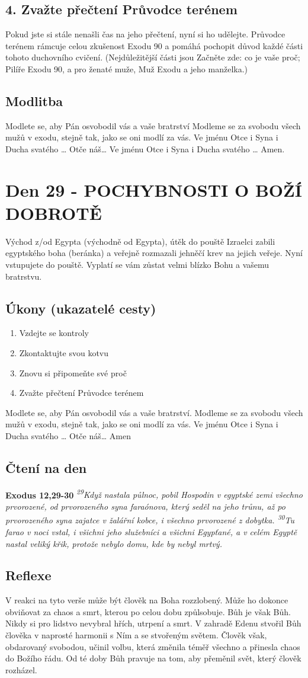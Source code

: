 \documentclass[11pt]{article}
\newcommand{\zacatekPatyTyden}{
  Východ z/od Egypta (východně od Egypta), útěk do pouště \newline
  Izraelci zabili egyptského boha (beránka) a veřejně rozmazali jehněčí krev na jejich veřeje. Nyní vstupujete
  do pouště. Vyplatí se vám zůstat velmi blízko Bohu a vašemu bratrstvu.

\subsection*{Úkony (ukazatelé cesty)}
\begin{enumerate}
  \item Vzdejte se kontroly
  \item Zkontaktujte svou kotvu
  \item Znovu si připomeňte své proč
  \item Zvažte přečtení Průvodce terénem
\end{enumerate}
Modlete se, aby Pán osvobodil vás a vaše bratrství. \newline
Modleme se za svobodu všech mužů v exodu, stejně tak, jako se oni modlí za vás.\newline
Ve jménu Otce i Syna i Ducha svatého …  Otče náš… Amen
}
\begin{document}
\subsection*{4. Zvažte přečtení Průvodce terénem}
Pokud jste si stále nenašli čas na jeho přečtení, nyní si ho udělejte. Průvodce terénem rámcuje celou zkušenost Exodu 90 a pomáhá pochopit důvod každé části tohoto duchovního cvičení. (Nejdůležitější části jsou Začněte zde: co je vaše proč; Pilíře Exodu 90, a pro ženaté muže, Muž Exodu a jeho manželka.)

\subsection*{Modlitba}
Modlete se, aby Pán osvobodil vás a vaše bratrství \newline
Modleme se za svobodu všech mužů v exodu, stejně tak, jako se oni modlí za vás.\newline
Ve jménu Otce i Syna i Ducha svatého … Otče náš… Ve jménu Otce i Syna i Ducha svatého … Amen.


\newpage
\section{Den 29 - POCHYBNOSTI O BOŽÍ DOBROTĚ}
\zacatekPatyTyden
\subsection*{Čtení na den}
\textbf{Exodus 12,29-30}
\newline
\textit{
\textsuperscript{29}Když nastala půlnoc, pobil Hospodin v egyptské zemi všechno prvorozené, od prvorozeného syna faraónova, který seděl na jeho trůnu, až po prvorozeného syna zajatce v žalářní kobce, i všechno prvorozené z dobytka.
\textsuperscript{30}Tu farao v noci vstal, i všichni jeho služebníci a všichni Egypťané, a v celém Egyptě nastal veliký křik, protože nebylo domu, kde by nebyl mrtvý.
}

\subsection*{Reflexe}

V reakci na tyto verše může být člověk na Boha rozzlobený. Může ho dokonce obviňovat za chaos a smrt,
kterou po celou dobu způlsobuje. Bůh je však Bůh. Nikdy si pro lidstvo nevybral hřích, utrpení a smrt.
V zahradě Edenu stvořil Bůh člověka v naprosté harmonii s Ním a se stvořeným světem. Člověk však,
obdarovaný svobodou, učinil volbu, která změnila téměř všechno a přinesla chaos do Božího řádu. Od té
doby Bůh pravuje na tom, aby přeměnil svět, který člověk rozházel.
\end{document}
